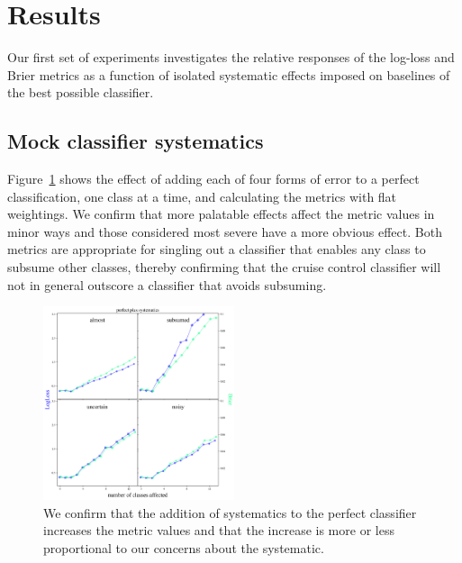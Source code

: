 \section{Results}
\label{sec:results}

Our first set of experiments investigates the relative responses of the log-loss and Brier metrics as a function of isolated systematic effects imposed on baselines of the best possible classifier.

\subsection{Mock classifier systematics}
\label{sec:mockresults}

Figure~\ref{fig:cruise} shows the effect of adding each of four forms of error to a perfect classification, one class at a time, and calculating the metrics with flat weightings.
We confirm that more palatable effects affect the metric values in minor ways and those considered most severe have a more obvious effect.
Both metrics are appropriate for singling out a classifier that enables any class to subsume other classes, thereby confirming that the cruise control classifier will not in general outscore a classifier that avoids subsuming.

\begin{figure}
	\begin{center}
		\includegraphics[width=0.5\textwidth]{./fig/systematics_onlyperfect.png}
		\caption{We confirm that the addition of systematics to the perfect classifier increases the metric values and that the increase is more or less proportional to our concerns about the systematic.}
		\label{fig:cruise}
	\end{center}
\end{figure}




